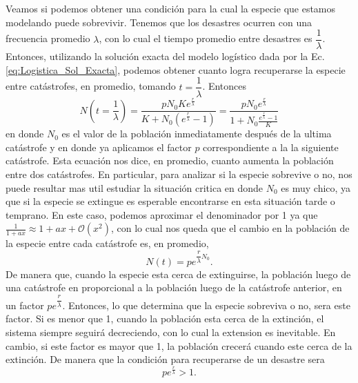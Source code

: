 Veamos si podemos obtener una condición para la cual la especie que estamos modelando puede sobrevivir. Tenemos que los desastres ocurren con una frecuencia promedio $\lambda$, con lo cual el tiempo promedio entre desastres es $\dfrac{1}{\lambda}$. Entonces, utilizando la solución exacta del modelo logístico dada por la Ec. \ref{eq:Logistica_Sol_Exacta}, podemos obtener cuanto logra recuperarse la especie entre catástrofes, en promedio, tomando $t=\dfrac{1}{\lambda}$. Entonces
\begin{equation}
    N(t=\frac{1}{\lambda}) = \frac{pN_{0} K e^{\frac{r}{\lambda}}}{K+N_{0}(e^{\frac{r}{\lambda}}-1)} = \frac{pN_{0} e^{\frac{r}{\lambda}}}{1+N_{0}\frac{e^{\frac{r}{\lambda}}-1}{K}} 
\end{equation}
en donde $N_{0}$ es el valor de la población inmediatamente después de la ultima catástrofe y en donde ya aplicamos el factor $p$ correspondiente a la la siguiente catástrofe. Esta ecuación nos dice, en promedio, cuanto aumenta la población entre dos catástrofes. En particular, para analizar si la especie sobrevive o no, nos puede resultar mas util estudiar la situación critica en donde $N_{0}$ es muy chico, ya que si la especie se extingue es esperable encontrarse en esta situación tarde o temprano. En este caso, podemos aproximar el denominador por 1 ya que $\frac{1}{1+ax} \approx 1 + ax + \mathcal{O}(x^2)$, con lo cual nos queda que el cambio en la población de la especie entre cada catástrofe es, en promedio,
\begin{equation}
    N(t) = pe^{\dfrac{r}{\lambda}N_{0}}.
\end{equation}
De manera que, cuando la especie esta cerca de extinguirse, la población luego de una catástrofe en proporcional a la población luego de la catástrofe anterior, en un factor $pe^{\dfrac{r}{\lambda}}$. Entonces, lo que determina que la especie sobreviva o no, sera este factor. Si es menor que 1, cuando la población esta cerca de la extinción, el sistema siempre seguirá decreciendo, con lo cual la extension es inevitable. En cambio, si este factor es mayor que 1, la población crecerá cuando este cerca de la extinción. De manera que la condición para recuperarse de un desastre sera
\begin{equation}
    pe^{\frac{r}{\lambda}} > 1.
\end{equation}

